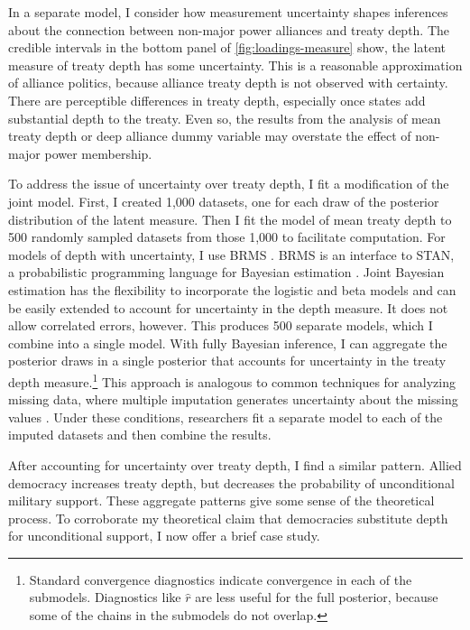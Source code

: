 \documentclass[12pt]{article}
\begin{document}
 
In a separate model, I consider how measurement uncertainty shapes inferences about the connection between non-major power alliances and treaty depth. 
The credible intervals in the bottom panel of \autoref{fig:loadings-measure} show, the latent measure of treaty depth has some uncertainty. 
This is a reasonable approximation of alliance politics, because alliance treaty depth is not observed with certainty. 
There are perceptible differences in treaty depth, especially once states add substantial depth to the treaty. 
Even so, the results from the analysis of mean treaty depth or deep alliance dummy variable may overstate the effect of non-major power membership. 


To address the issue of uncertainty over treaty depth, I fit a modification of the joint model. 
First, I created 1,000 datasets, one for each draw of the posterior distribution of the latent measure.
Then I fit the model of mean treaty depth to 500 randomly sampled datasets from those 1,000 to facilitate computation. 
For models of depth with uncertainty, I use BRMS \citep{Buerkner2017}. 
BRMS is an interface to STAN, a probabilistic programming language for Bayesian estimation \citep{Carpenteretal2016}. 
Joint Bayesian estimation has the flexibility to incorporate the logistic and beta models and can be easily extended to account for uncertainty in the depth measure. 
It does not allow correlated errors, however.
This produces 500 separate models, which I combine into a single model. 
With fully Bayesian inference, I can aggregate the posterior draws in a single posterior that accounts for uncertainty in the treaty depth measure.\footnote{Standard convergence diagnostics indicate convergence in each of the submodels. Diagnostics like $\hat{r}$ are less useful for the full posterior, because some of the chains in the submodels do not overlap.}
This approach is analogous to common techniques for analyzing missing data, where multiple imputation generates uncertainty about the missing values \citep{Hollenbachetal2018imp}.
Under these conditions, researchers fit a separate model to each of the imputed datasets and then combine the results. 


After accounting for uncertainty over treaty depth, I find a similar pattern. 
Allied democracy increases treaty depth, but decreases the probability of unconditional military support. 
These aggregate patterns give some sense of the theoretical process. 
To corroborate my theoretical claim that democracies substitute depth for unconditional support, I now offer a brief case study. 
\end{document}
